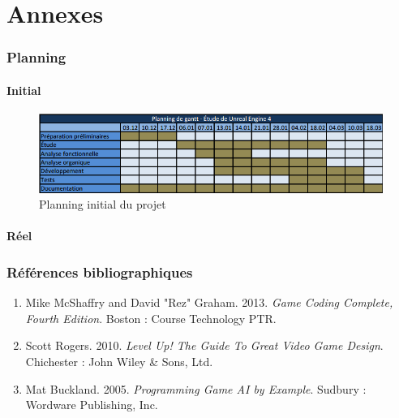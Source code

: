 \documentclass[11pt, a4paper, oneside]{article}
\begin{document}
\part{Annexes}
\section{Planning}
\subsection{Initial}
\begin{figure}[h]
	\begin{center}
	\includegraphics[scale=.924, angle=90]{planninggantt}
	\caption{Planning initial du projet}
	\label{planningintial}
	\end{center}
\end{figure}
\newpage
\subsection{Réel}
\newpage
\section{Références bibliographiques}
\begin{enumerate}
\item Mike McShaffry and David "Rez" Graham. 2013. \textit{Game Coding Complete, Fourth Edition}. Boston : Course Technology PTR.
\item Scott Rogers. 2010. \textit{Level Up! The Guide To Great Video Game Design}. Chichester : John Wiley \& Sons, Ltd.
\item Mat Buckland. 2005. \textit{Programming Game AI by Example}. Sudbury : Wordware Publishing, Inc.
\end{enumerate}
\newpage
\listoffigures
\end{document}

